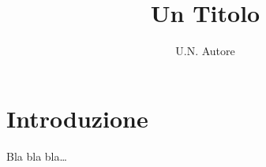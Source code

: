 \documentclass{article}
\title{Un Titolo}
\author{U.N. Autore}
\begin{document}
\maketitle

\section{Introduzione}
Bla bla bla\ldots
\end{document}
